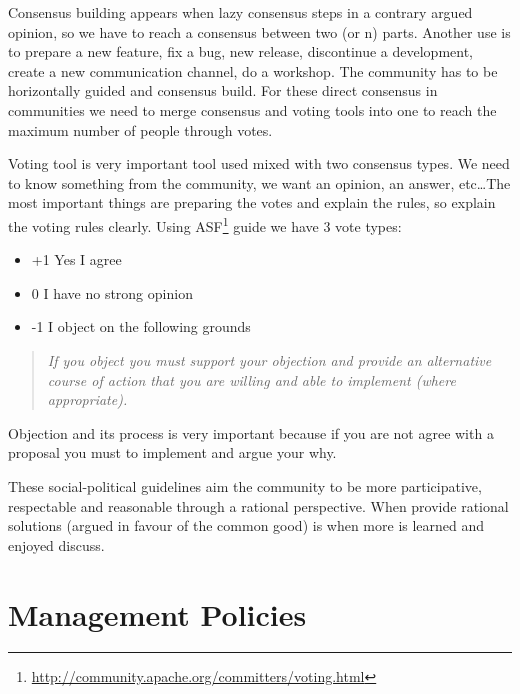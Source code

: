\documentclass[11pt]{scrartcl}
\begin{document}
\par Consensus building appears when lazy consensus steps in a contrary argued opinion, so we have to reach a consensus between two (or n) parts. Another use is to prepare a new feature, fix a bug, new release, discontinue a development, create a new communication channel, do a workshop. The community has to be horizontally guided and consensus build. For these direct consensus in communities we need to merge consensus and voting tools into one to reach the maximum number of people through votes.

\par Voting tool is very important tool used mixed with two consensus types. We need to know something from the community, we want an opinion, an answer, etc\ldots The most important things are preparing the votes and explain the rules, so explain the voting rules clearly. Using ASF\footnote{\url{http://community.apache.org/committers/voting.html}} guide we have 3 vote types:

\begin{itemize}
	\item +1 Yes I agree
	\item 0 I have no strong opinion
	\item -1 I object on the following grounds
\end{itemize}

\begin{quote}
    \emph{If you object you must support your objection and provide an alternative course of action that you are willing and able to implement (where appropriate).}
\end{quote}

\par Objection and its process is very important because if you are not agree with a proposal you must to implement and argue your why.

\par These social-political guidelines aim the community to be more participative, respectable and reasonable through a rational perspective. When provide rational solutions (argued in favour of the common good) is when more is learned and enjoyed discuss.


\section{Management Policies}
\label{sec:management-policies}
\end{document}
